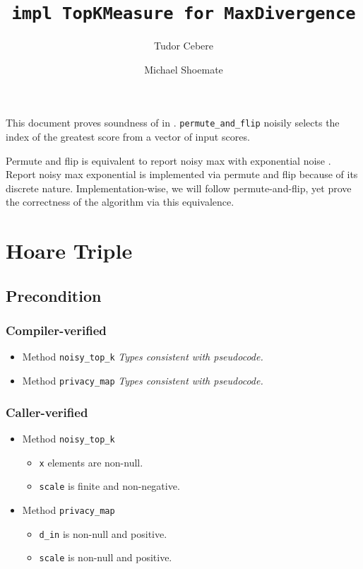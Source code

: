 \documentclass{article}
\title{\texttt{impl TopKMeasure for MaxDivergence}}
\author{Tudor Cebere \and Michael Shoemate}
\begin{document}
  
\maketitle 
\contrib

This document proves soundness of  \cite{mckenna2020permute} in . 
\texttt{permute\_and\_flip} noisily selects the index of the greatest score from a vector of input scores.

Permute and flip is equivalent to report noisy max with exponential noise \cite{ding2021permute}. 
Report noisy max exponential is implemented via permute and flip because of its discrete nature.
Implementation-wise, we will follow permute-and-flip, 
yet prove the correctness of the algorithm via this equivalence.
 
\section{Hoare Triple} 
\subsection*{Precondition} 
\subsubsection*{Compiler-verified}
\begin{itemize}
    \item Method \texttt{noisy\_top\_k}
        \textit{Types consistent with pseudocode.}
    \item Method \texttt{privacy\_map}
        \textit{Types consistent with pseudocode.}
\end{itemize}

\subsubsection*{Caller-verified}
\begin{itemize}
    \item Method \texttt{noisy\_top\_k}
        \begin{itemize}
            \item \texttt{x} elements are non-null.
            \item \texttt{scale} is finite and non-negative.
        \end{itemize}
    \item Method \texttt{privacy\_map}
        \begin{itemize}
            \item \texttt{d\_in} is non-null and positive.
            \item \texttt{scale} is non-null and positive.
        \end{itemize}
\end{itemize}
\end{document}
